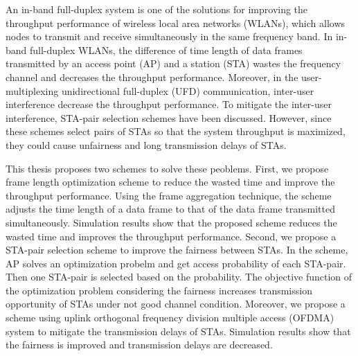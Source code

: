 \documentclass[master]{kuisthesis}		%
\begin{document}
\begin{eabstract}				%
	An in-band full-duplex system is one of the solutions for improving the throughput performance of wireless local area networks (WLANs), which allows nodes to transmit and receive simultaneously in the same frequency band. In in-band full-duplex WLANs, the difference of time length of data frames transmitted by an access point (AP) and a station (STA) wastes the frequency channel and decreases the throughput performance. Moreover, in the user-multiplexing unidirectional full-duplex (UFD) communication, inter-user interference decrease the throughput performance. To mitigate the inter-user interference, STA-pair selection schemes have been discussed.
	However, since these schemes select pairs of STAs so that the system throughput is maximized, they could cause unfairness and long transmission delays of STAs.
	\par
	This thesis proposes two schemes to solve these peoblems. First, we propose frame length optimization scheme to reduce the wasted time and improve the throughput performance. Using the frame aggregation technique, the scheme adjusts the time length of a data frame to that of the data frame transmitted simultaneously. Simulation results show that the proposed scheme reduces the wasted time and improves the throughput performance. Second, we propose a STA-pair selection scheme to improve the fairness between STAs. In the scheme, AP solves an optimization probelm and get access probability of each STA-pair. Then one STA-pair is selected based on the probability. The objective function of the optimization problem considering the fairness increases transmission opportunity of STAs under not good channel condition. Moreover, we propose a scheme using uplink orthogonal frequency division multiple access (OFDMA) system to mitigate the transmission delays of STAs. Simulation results show that the fairness is improved and transmission delays are decreased.\\
\end{eabstract}

\tableofcontents				%

\end{document}
